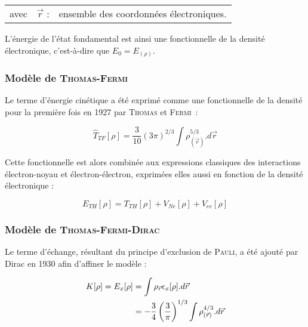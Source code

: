 	\begin{flushleft}
		\begin{tabular}{@{}lrp{10cm}}
			avec & $\vec{r}$ : & ensemble des coordonnées électroniques. 
		\end{tabular}
	\end{flushleft}
	
	
	L'énergie de l'état fondamental est ainsi une fonctionnelle de la densité électronique, c'est-à-dire que $E_{0} = E_{(\rho)}$.
	
	\subsubsection{Modèle de \textsc{Thomas-Fermi}}
	
	Le terme d'énergie cinétique a été exprimé comme une fonctionnelle de la densité pour la première fois en 1927 par \textsc{Thomas} et \textsc{Fermi}~:
	
	\begin{equation}
	\hat{T}_{TF}[\rho] = \frac{3}{10} (3\pi)^{2/3} \int \rho_{(\vec{r})}^{5/3} .d\vec{r}
	\label{ener_cin_thom_ferm}
	\end{equation}
	
	Cette fonctionnelle est alors combinée aux expressions classiques des interactions électron-noyau et électron-électron, exprimées elles aussi en fonction de la densité électronique :
	
	\begin{equation}
	E_{TH}[\rho] = T_{TH}[\rho] + V_{Ne}[\rho] + V_{ee}[\rho]
	\end{equation}
	
	\subsubsection{Modèle de \textsc{Thomas-Fermi-Dirac}}
	
	Le terme d'échange, résultant du principe d'exclusion de \textsc{Pauli}, a été ajouté par Dirac en 1930 afin d'affiner le modèle :
	
	\begin{align}
	K[\rho] = E_{x}[\rho] &= \int \rho_{\vec{r}} \epsilon_{x}[\rho] .d\vec{r} \\
	&= -\frac{3}{4} \left(\frac{3}{\pi}\right)^{1/3} \int \rho_{(\vec{r})}^{4/3} .d\vec{r} \notag
	\end{align}
	
